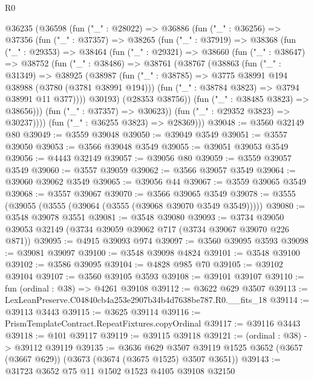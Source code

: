 \begin{lexlean}{R0}
\begin{coremodule}
  @36235
    (@36598
      (fun ("_" : @28022) =>
      @36886
        (fun ("_" : @36256) =>
        @37356
          (fun ("_" : @37357) =>
          @38265
            (fun ("_" : @37919) =>
            @38368
              (fun ("_" : @29353) =>
              @38464
                (fun ("_" : @29321) =>
                @38660
                  (fun ("_" : @38647) =>
                  @38752
                    (fun ("_" : @38486) =>
                    @38761
                      (@38767
                        (@38863
                          (fun ("_" : @31349) =>
                          @38925
                            (@38987
                              (fun ("_" : @38785) =>
                              @3775 @38991 @194 @38988 (@3780 (@3781 @38991 @194)))
                              (fun ("_" : @38784 @3823) => @3794 @38991 @11 @377))))
                        @30193)
                      (@28353 @38756))
                    (fun ("_" : @38485 @3823) => @38656)))
                (fun ("_" : @37357) => @30623))
              (fun ("_" : @29352 @3823) => @30237))))
        (fun ("_" : @36255 @3823) => @28369)))
@39048 := @3560 @32149 @80
@39049 := @3559 @39048
@39050 := @39049 @3549
@39051 := @3557 @39050
@39053 := @3566 @39048 @3549
@39055 := @39051 @39053 @3549
@39056 := @4443 @32149
@39057 := @39056 @80
@39059 := @3559 @39057 @3549
@39060 := @3557 @39059
@39062 := @3566 @39057 @3549
@39064 := @39060 @39062 @3549
@39065 := @39056 @44
@39067 := @3559 @39065 @3549
@39068 := @3557 @39067
@39070 := @3566 @39065 @3549
@39078 := @3555 (@39055 (@3555 (@39064 (@3555 (@39068 @39070 @3549 @3549)))))
@39080 := @3548 @39078 @3551
@39081 := @3548 @39080
@39093 := @3734 @39050 @39053 @32149 (@3734 @39059 @39062 @717 (@3734 @39067 @39070 @226 @871))
@39095 := @4915 @39093 @974
@39097 := @3560 @39095 @3593
@39098 := @39081 @39097
@39100 := @3548 @39098 @4824
@39101 := @3548 @39100
@39102 := @3586 @39095
@39104 := @4828 @985 @70
@39105 := @39102 @39104
@39107 := @3560 @39105 @3593
@39108 := @39101 @39107
@39110 := fun (ordinal : @38) => @4261 @39108
@39112 := @3622 @629 @3507
@39113 := LexLeanPreserve.C04840cb4a253e2907b34b4d7638be787.R0.__fits_18
@39114 := @39113 @3443
@39115 := @3625 @39114
@39116 := PrismTemplateContract.RepeatFixtures.copyOrdinal
@39117 := @39116 @3443
@39118 := @101 @39117
@39119 := @39115 @39118
@39121 := (ordinal : @38) -> @39112 @39119
@39135 := @3636
    @629
    @3507
    @39119
    @1525
    @3652
    (@3657 (@3667 @629))
    (@3673 (@3674 (@3675 @1525) @3507 @3651))
@39143 := @31723 @3652 @75 @11 @1502 @1523 @4105 @39108 @32150

\end{coremodule}
\end{lexlean}
